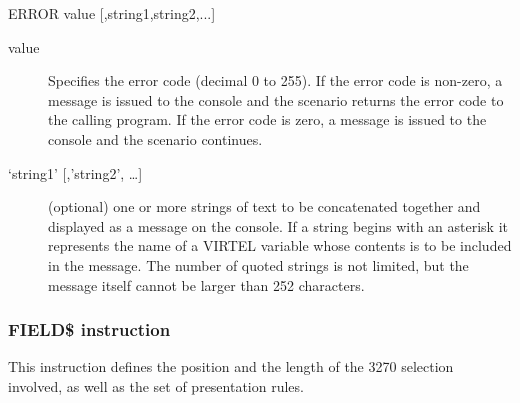 \documentclass[letterpaper,10pt,english]{sphinxmanual}
\begin{document}
\begin{sphinxVerbatim}[commandchars=\\\{\}]
ERROR\PYGZdl{} value [,\PYGZsq{}string1\PYGZsq{},\PYGZsq{}string2\PYGZsq{},...]
\end{sphinxVerbatim}
\begin{description}
\item[{value}] \leavevmode
Specifies the error code (decimal 0 to 255). If the error code is non-zero, a message is issued to the console and the scenario returns the error code to the calling program. If the error code is zero, a message is issued to the console and the scenario continues.

\item[{‘string1’ {[},’string2’, …{]}}] \leavevmode
(optional) one or more strings of text to be concatenated together and displayed as a message on the console. If a string begins with an asterisk it represents the name of a VIRTEL variable whose contents is to be included in the message. The number of quoted strings is not limited, but the message itself cannot be larger than 252 characters.

\end{description}


\subsubsection{FIELD\$ instruction}
\label{\detokenize{User_Guide:field-instruction}}
This instruction defines the position and the length of the 3270 selection involved, as well as the set of presentation rules.
\end{document}
